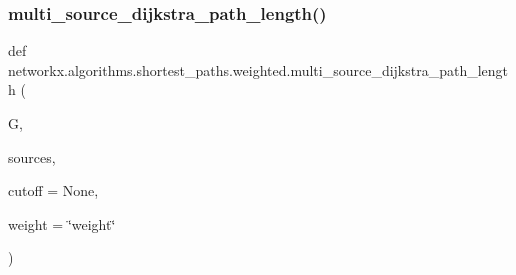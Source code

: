 \subsubsection{\texorpdfstring{multi\+\_\+source\+\_\+dijkstra\+\_\+path\+\_\+length()}{multi\_source\_dijkstra\_path\_length()}}
{\footnotesize\ttfamily def networkx.\+algorithms.\+shortest\+\_\+paths.\+weighted.\+multi\+\_\+source\+\_\+dijkstra\+\_\+path\+\_\+length (\begin{DoxyParamCaption}\item[{}]{G,  }\item[{}]{sources,  }\item[{}]{cutoff = {\ttfamily None},  }\item[{}]{weight = {\ttfamily \char`\"{}weight\char`\"{}} }\end{DoxyParamCaption})}

